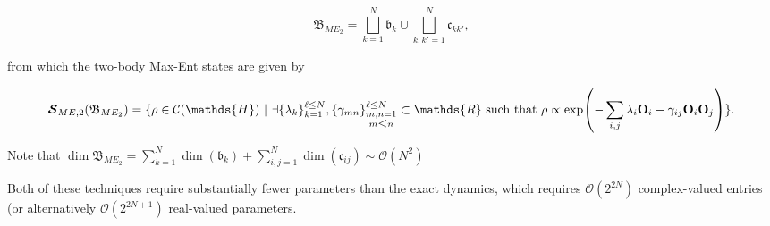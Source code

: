 \documentclass{homework}
\begin{document}
\begin{tcolorbox}[title = N\"aive two-body Max-Ent]
$$
    \mathfrak{B}_{ME_2} = \bigsqcup_{k=1}^{N} \mathfrak{b}_k \cup \bigsqcup_{k, k' = 1}^{N} \mathfrak{c}_{kk'},
$$

from which the two-body Max-Ent states are given by 

\begin{equation}
    \bm{\mathcal{S}}_{ME,2} (\mathfrak{B}_{ME_2}) = \{ \rho \in \mathcal{C}(\mathds{H}) \blanky | \blanky \exists \{\lambda_k\}_{k=1}^{\ell \leq N}, \{\gamma_{mn}\}_{\substack{m,n=1\\
                      {m \mbox{\textless} n}}}^{\ell \leq N} \subset \mathds{R} \textnormal{ such that }  \rho \propto \exp(-\sum_{i,j}\lambda_i {\bf O}_i - \gamma_{ij} {\bf O}_i {\bf O}_j ) \}. 
\end{equation}

Note that $\dim \mathfrak{B}_{ME_2} = \sum_{k=1}^N \dim(\mathfrak{b}_k) + \sum_{i, j=1}^N \dim(\mathfrak{c}_{ij}) \sim \mathcal{O}(N^2)$
\end{tcolorbox}

Both of these techniques require substantially fewer parameters than the exact dynamics, which requires $\mathcal{O}(2^{2N})$ complex-valued entries (or alternatively $\mathcal{O}(2^{2N + 1})$ real-valued parameters. 


\end{document}
